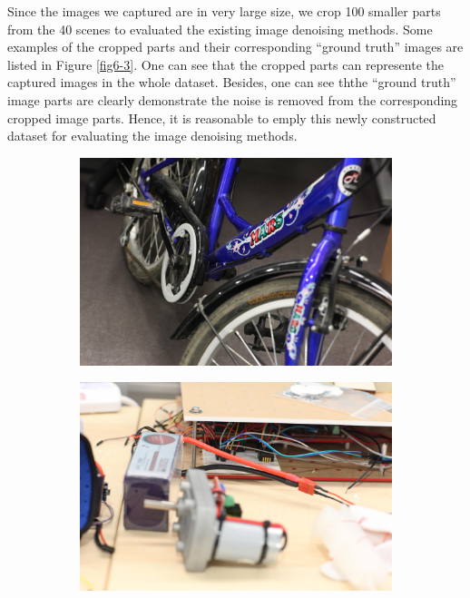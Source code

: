 Since the images we captured are in very large size, we crop 100 smaller parts from the 40 scenes to evaluated the existing image denoising methods. Some examples of the cropped parts and their corresponding ``ground truth'' images are listed in Figure \ref{fig6-3}. One can see that the cropped parts can represente the captured images in the whole dataset. Besides, one can see ththe ``ground truth'' image parts are clearly demonstrate the noise is removed from the corresponding cropped image parts. Hence, it is reasonable to emply this newly constructed dataset for evaluating the image denoising methods.


\begin{figure}
    \centering
    \begin{subfigure}[t]{0.32\textwidth}
        \centering
        \includegraphics[width=1\textwidth]{images/dataset/Canon5D2_5_160_6400_bicycle_mean.JPG}
    \end{subfigure}
    \hfill
    \begin{subfigure}[t]{0.32\textwidth}
        \centering
        \includegraphics[width=1\textwidth]{images/dataset/Canon5D2_5_160_6400_circuit_mean.JPG}

\end{subfigure}
\end{figure}

